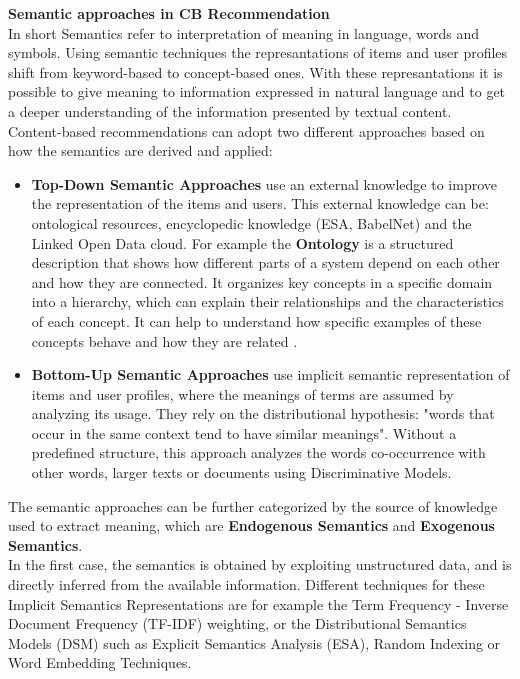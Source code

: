 \documentclass[\myFontSize,oneside,english,hidelinks,a4paper]{article}
\begin{document}
%
%
%
%
\textbf{Semantic approaches in CB Recommendation}\\
In short Semantics refer to interpretation of meaning in language, words and symbols. Using semantic techniques the represantations of items and user profiles shift from keyword-based to concept-based ones.  With these represantations it is possible to give meaning to information expressed in natural language and to get a deeper understanding of the information presented by textual content.\\
Content-based recommendations can adopt two different approaches based on how the semantics are derived and applied:
\begin{itemize}
\item \textbf{Top-Down Semantic Approaches} use an external knowledge to improve the representation of the items and users. This external knowledge can be: ontological resources, encyclopedic knowledge (ESA, BabelNet) and the Linked Open Data cloud. For example the \textbf{Ontology} is a structured description that shows how different parts of a system depend on each other and how they are connected. It organizes key concepts in a specific domain into a hierarchy, which can explain their relationships and the characteristics of each concept. It can help to understand how specific examples of these concepts behave and how they are related \cite{pub.1090632691}.
%
\item \textbf{Bottom-Up Semantic Approaches} use implicit semantic representation of items and user profiles, where the meanings of terms are assumed by analyzing its usage. They rely on the distributional hypothesis: "words that occur in the same context tend to have similar meanings". Without a predefined structure, this approach analyzes the words co-occurrence with other words, larger texts or documents using Discriminative Models.\cite{DeGemmis2015119}\\
\end{itemize}
%
%
The semantic approaches can be further categorized by the source of knowledge used to extract meaning, which are \textbf{Endogenous Semantics} and \textbf{Exogenous Semantics}.\\
In the first case, the semantics is obtained by exploiting unstructured data, and is directly inferred from the available information. Different techniques for these Implicit Semantics Representations are for example the Term Frequency - Inverse Document Frequency (TF-IDF) weighting, or the Distributional Semantics Models (DSM) such as Explicit Semantics Analysis (ESA), Random Indexing or Word Embedding Techniques.
\end{document}
